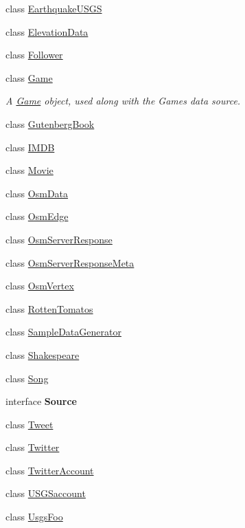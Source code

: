 \begin{DoxyCompactItemize}
class \hyperlink{classbridges_1_1data__src__dependent_1_1_earthquake_u_s_g_s}{Earthquake\+U\+S\+GS}
\item 
class \hyperlink{classbridges_1_1data__src__dependent_1_1_elevation_data}{Elevation\+Data}
\item 
class \hyperlink{classbridges_1_1data__src__dependent_1_1_follower}{Follower}
\item 
class \hyperlink{classbridges_1_1data__src__dependent_1_1_game}{Game}
\begin{DoxyCompactList}\small\item\em A \hyperlink{classbridges_1_1data__src__dependent_1_1_game}{Game} object, used along with the Games data source. \end{DoxyCompactList}\item 
class \hyperlink{classbridges_1_1data__src__dependent_1_1_gutenberg_book}{Gutenberg\+Book}
\item 
class \hyperlink{classbridges_1_1data__src__dependent_1_1_i_m_d_b}{I\+M\+DB}
\item 
class \hyperlink{classbridges_1_1data__src__dependent_1_1_movie}{Movie}
\item 
class \hyperlink{classbridges_1_1data__src__dependent_1_1_osm_data}{Osm\+Data}
\item 
class \hyperlink{classbridges_1_1data__src__dependent_1_1_osm_edge}{Osm\+Edge}
\item 
class \hyperlink{classbridges_1_1data__src__dependent_1_1_osm_server_response}{Osm\+Server\+Response}
\item 
class \hyperlink{classbridges_1_1data__src__dependent_1_1_osm_server_response_meta}{Osm\+Server\+Response\+Meta}
\item 
class \hyperlink{classbridges_1_1data__src__dependent_1_1_osm_vertex}{Osm\+Vertex}
\item 
class \hyperlink{classbridges_1_1data__src__dependent_1_1_rotten_tomatos}{Rotten\+Tomatos}
\item 
class \hyperlink{classbridges_1_1data__src__dependent_1_1_sample_data_generator}{Sample\+Data\+Generator}
\item 
class \hyperlink{classbridges_1_1data__src__dependent_1_1_shakespeare}{Shakespeare}
\item 
class \hyperlink{classbridges_1_1data__src__dependent_1_1_song}{Song}
\item 
interface {\bfseries Source}
\item 
class \hyperlink{classbridges_1_1data__src__dependent_1_1_tweet}{Tweet}
\item 
class \hyperlink{classbridges_1_1data__src__dependent_1_1_twitter}{Twitter}
\item 
class \hyperlink{classbridges_1_1data__src__dependent_1_1_twitter_account}{Twitter\+Account}
\item 
class \hyperlink{classbridges_1_1data__src__dependent_1_1_u_s_g_saccount}{U\+S\+G\+Saccount}
\item 
class \hyperlink{classbridges_1_1data__src__dependent_1_1_usgs_foo}{Usgs\+Foo}
\end{DoxyCompactItemize}
